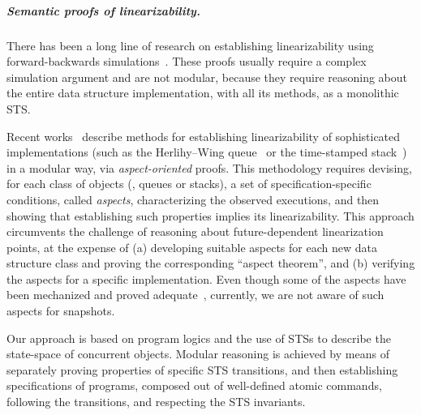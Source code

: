 
\subparagraph*{Semantic proofs of linearizability.}
\label{sec:semant-proofs-line}

There has been a long line of research on establishing linearizability
using forward-backwards
simulations~\cite{SchellhornWD+CAV12,ColvinGLM06,ColvinDG05}. These
proofs usually require a complex simulation argument and are not
modular, because they require reasoning about the entire data
structure implementation, with all its methods, as a monolithic STS.

Recent works~\cite{HenzingerSV+CONCUR13, ChakrabortyHSV+LMCS15,
  DoddsHK+POPL15} describe methods for establishing linearizability of
sophisticated implementations (such as the Herlihy--Wing
queue~\cite{HerlihyW+TOPLAS90} or the time-stamped
stack~\cite{DoddsHK+POPL15}) in a modular way, via
\emph{aspect-oriented} proofs.
%
This methodology requires devising, for each class of objects (\eg,
queues or stacks), a set of specification-specific conditions, called
{\it aspects}, characterizing the observed executions, and then
showing that establishing such properties implies its linearizability.
%
This approach circumvents the challenge of reasoning about
future-dependent linearization points, at the expense of (a)
developing suitable aspects for each new data structure class and
proving the corresponding ``aspect theorem'', and (b) verifying the
aspects for a specific implementation. 
%
%
Even though some of the aspects have been mechanized and proved
adequate~\cite{DoddsHK+POPL15}, 
%
currently, we are not aware of such aspects for snapshots.



Our approach is based on program logics and the use of STSs to
describe the state-space of concurrent objects. Modular reasoning is
achieved by means of separately proving properties of specific STS
transitions, and then establishing specifications of programs,
composed out of well-defined atomic commands, following the
transitions, and respecting the STS invariants.

